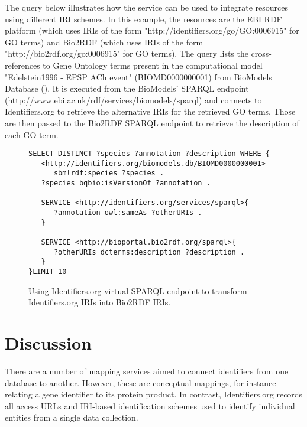 \documentclass{bioinfo}
\begin{document}
The query below illustrates how the service can be used to integrate resources using different IRI schemes. In this example, the resources are the EBI RDF platform (which uses IRIs of the form "http://identifiers.org/go/GO:0006915" for GO terms) and Bio2RDF (which uses IRIs of the form "http://bio2rdf.org/go:0006915" for GO terms). The query lists the cross-references to Gene Ontology terms present in the computational model "Edelstein1996 - EPSP ACh event" (BIOMD0000000001) from BioModels Database (\cite{Li2010}). It is executed from the BioModels' SPARQL endpoint (http://www.ebi.ac.uk/rdf/services/biomodels/sparql) and connects to Identifiers.org to retrieve the alternative IRIs for the retrieved GO terms. Those are then passed to the Bio2RDF SPARQL endpoint to retrieve the description of each GO term.

\begin{figure}[h]
{\scriptsize
\begin{verbatim}
SELECT DISTINCT ?species ?annotation ?description WHERE { 
   <http://identifiers.org/biomodels.db/BIOMD0000000001> 
      sbmlrdf:species ?species . 
   ?species bqbio:isVersionOf ?annotation .

   SERVICE <http://identifiers.org/services/sparql>{
      ?annotation owl:sameAs ?otherURIs .
   }

   SERVICE <http://bioportal.bio2rdf.org/sparql>{
      ?otherURIs dcterms:description ?description .
   }        
}LIMIT 10
\end{verbatim}
}
  \caption{Using Identifiers.org virtual SPARQL endpoint to transform Identifiers.org IRIs into Bio2RDF IRIs.}
  \label{translatestuff}
\end{figure}


\section{Discussion}
There are a number of mapping services aimed to connect identifiers from one database to another. However, these are conceptual mappings, for instance relating a gene identifier to its protein product. In contrast, Identifiers.org records all access URLs and IRI-based identification schemes used to identify individual entities from a single data collection.
\end{document}
